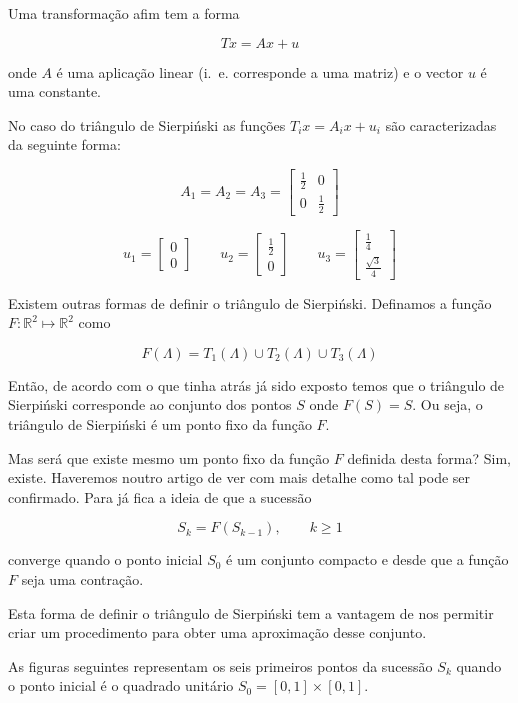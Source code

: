 \documentclass[11pt]{article}
\begin{document}
Uma transformação afim tem a forma

\[
Tx = Ax + u
\]

onde $A$ é uma aplicação linear (i.~e. corresponde a uma matriz) e o
vector $u$ é uma constante.

No caso do triângulo de Sierpiński as funções $T_i x = A_i x + u_i$
são caracterizadas da seguinte forma:

\[
A_1 = A_2 = A_3 = \left[
  \begin{array}{cc}
    \frac{1}{2} & 0 \\
    0 & \frac{1}{2}
  \end{array} \right]
\]


\[
u_1 = \left[
  \begin{array}{c}
    0 \\
    0
  \end{array}
\right]
\qquad
u_2 = \left[
  \begin{array}{c}
    \frac{1}{2} \\
    0 \end{array}
\right]
\qquad
u_3 = \left[
  \begin{array}{c}
    \frac{1}{4} \\
    \frac{\sqrt{3}}{4}
  \end{array}
\right]
\]


Existem outras formas de definir o triângulo de Sierpiński. Definamos
a função $F : {\mathbb R}^2 \mapsto {\mathbb R}^2$ como

\[
F(\Lambda) = T_1(\Lambda) \cup T_2(\Lambda) \cup T_3(\Lambda)
\]

Então, de acordo com o que tinha atrás já sido exposto temos que o
triângulo de Sierpiński corresponde ao conjunto dos pontos $S$ onde
$F(S)=S$. Ou seja, o triângulo de Sierpiński é um ponto fixo da função
$F$.

Mas será que existe mesmo um ponto fixo da função $F$ definida desta
forma? Sim, existe. Haveremos noutro artigo de ver com mais detalhe
como tal pode ser confirmado. Para já fica a ideia de que a sucessão

\[
S_k = F(S_{k-1}), \qquad k \ge 1
\]

converge quando o ponto inicial $S_0$ é um conjunto compacto e desde
que a função $F$ seja uma contração.

Esta forma de definir o triângulo de Sierpiński tem a vantagem de nos
permitir criar um procedimento para obter uma aproximação desse
conjunto.

As figuras seguintes representam os seis primeiros pontos da sucessão
$S_k$ quando o ponto inicial é o quadrado unitário $S_0 = [0,1] \times
[0,1]$.
\end{document}
